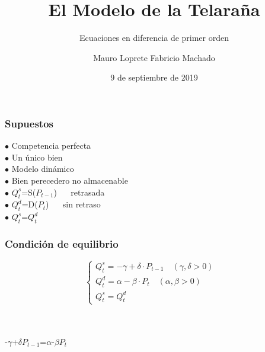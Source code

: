 \documentclass[11pt]{beamer}
\begin{document}
	\author{Mauro Loprete Fabricio Machado}
	\title{El Modelo de la Telaraña}
	\subtitle{Ecuaciones en diferencia de primer orden}
	\date{9 de septiembre de 2019}
	\subject{Cálculo 3}
	\begin{frame}
	\maketitle
	\end{frame}
\begin{frame}
\frametitle{Supuestos}
	$\bullet$ Competencia perfecta
	\\
	$\bullet$ Un único bien
	\\
	$\bullet$ Modelo dinámico
	\\
	$\bullet$ Bien perecedero no almacenable
	\\
	$\bullet$ $Q^s_t$=S($P_{t-1}$) $\quad$ retrasada
	\\	
	$\bullet$ $Q^d_t$=D($P_t$) $\quad$  sin retraso
	\\
	$\bullet$ $Q^s_t$=$Q^d_t$
\end{frame}
\begin{frame}
\frametitle{Condición de equilibrio}
\begin{equation*}
\left\{\begin{matrix}
Q^{s}_{t}=-\gamma+\delta\cdot P_{t-1} \quad (\gamma,\delta >0)
	& \\ Q^{d}_{t}=\alpha-\beta\cdot P_{t}  \quad   (\alpha,\beta>0)
	& \\ Q^{s}_{t}=Q^{d}_{t}
\end{matrix}\right.
\end{equation*}
\\
~
\begin{block}{}
	\begin{center}
		-$\gamma$+$\delta$$P_{t-1}$=$\alpha$-$\beta$$P_t$
	\end{center}
\end{block}
\end{frame}
\end{document}
